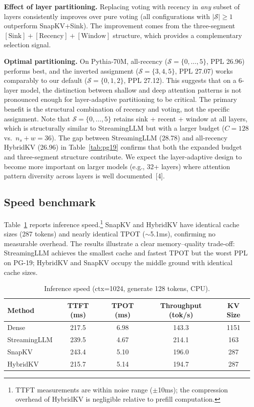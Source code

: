 \documentclass{article}
\begin{document}
\textbf{Effect of layer partitioning.} Replacing voting with recency in \emph{any} subset of layers consistently improves over pure voting (all configurations with $|\mathcal{S}| \geq 1$ outperform SnapKV+Sink). The improvement comes from the three-segment $[\text{Sink}] + [\text{Recency}] + [\text{Window}]$ structure, which provides a complementary selection signal.

\textbf{Optimal partitioning.} On Pythia-70M, all-recency ($\mathcal{S}\!=\!\{0,\ldots,5\}$, PPL 26.96) performs best, and the inverted assignment ($\mathcal{S}\!=\!\{3,4,5\}$, PPL 27.07) works comparably to our default ($\mathcal{S}\!=\!\{0,1,2\}$, PPL 27.12). This suggests that on a 6-layer model, the distinction between shallow and deep attention patterns is not pronounced enough for layer-adaptive partitioning to be critical. The primary benefit is the structural combination of recency and voting, not the specific assignment. Note that $\mathcal{S}\!=\!\{0,\ldots,5\}$ retains sink + recent + window at all layers, which is structurally similar to StreamingLLM but with a larger budget ($C\!=\!128$ vs.\ $n_s\!+\!w\!=\!36$). The gap between StreamingLLM (28.78) and all-recency HybridKV (26.96) in Table~\ref{tab:pg19} confirms that both the expanded budget and three-segment structure contribute. We expect the layer-adaptive design to become more important on larger models (e.g., 32+ layers) where attention pattern diversity across layers is well documented~[4].

\subsection{Speed benchmark}

Table~\ref{tab:speed} reports inference speed.\footnote{TTFT measurements are within noise range ($\pm$10ms); the compression overhead of HybridKV is negligible relative to prefill computation.} SnapKV and HybridKV have identical cache sizes (287 tokens) and nearly identical TPOT ($\sim$5.1ms), confirming no measurable overhead. The results illustrate a clear memory--quality trade-off: StreamingLLM achieves the smallest cache and fastest TPOT but the worst PPL on PG-19; HybridKV and SnapKV occupy the middle ground with identical cache sizes.

\begin{table}[h]
\caption{Inference speed (ctx=1024, generate 128 tokens, CPU).}
\label{tab:speed}
\centering
\begin{tabular}{lcccc}
\toprule
Method & TTFT (ms) & TPOT (ms) & Throughput (tok/s) & KV Size \\
\midrule
Dense & 217.5 & 6.98 & 143.3 & 1151 \\
StreamingLLM & 239.5 & 4.67 & 214.1 & 163 \\
SnapKV & 243.4 & 5.10 & 196.0 & 287 \\
HybridKV & 215.7 & 5.14 & 194.7 & 287 \\
\bottomrule
\end{tabular}
\end{table}
\end{document}
